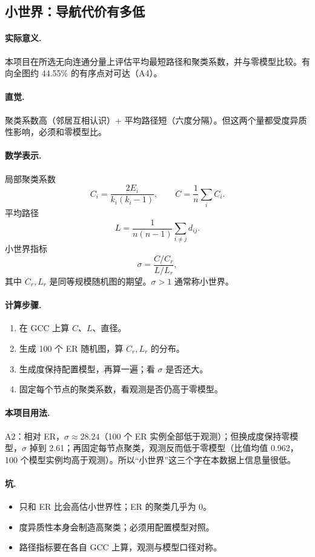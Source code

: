 \subsection{小世界：导航代价有多低}

\paragraph{实际意义.}
本项目在所选无向连通分量上评估平均最短路径和聚类系数，并与零模型比较。有向全图约 44.55\% 的有序点对可达（A4）。

\paragraph{直觉.}
聚类系数高（邻居互相认识）+ 平均路径短（六度分隔）。但这两个量都受度异质性影响，必须和零模型比。

\paragraph{数学表示.}
局部聚类系数
\[
C_i=\frac{2E_i}{k_i(k_i-1)},\qquad C=\frac1n\sum_i C_i.
\]
平均路径
\[
L=\frac{1}{n(n-1)}\sum_{i\ne j}d_{ij}.
\]
小世界指标
\[
\sigma=\frac{C/C_r}{L/L_r},
\]
其中 \(C_r,L_r\) 是同等规模随机图的期望。\(\sigma>1\) 通常称小世界。

\paragraph{计算步骤.}
\begin{enumerate}
  \item 在 GCC 上算 \(C\)、\(L\)、直径。
  \item 生成 100 个 ER 随机图，算 \(C_r,L_r\) 的分布。
  \item 生成度保持配置模型，再算一遍；看 \(\sigma\) 是否还大。
  \item 固定每个节点的聚类系数，看观测是否仍高于零模型。
\end{enumerate}

\paragraph{本项目用法.}
\unit{A2}：相对 ER，\(\sigma\approx 28.24\)（100 个 ER 实例全部低于观测）；但换成度保持零模型，\(\sigma\) 掉到 2.61；再固定每节点聚类，观测反而低于零模型（比值均值 0.962，100 个模型实例均高于观测）。所以“小世界”这三个字在本数据上信息量很低。

\paragraph{坑.}
\begin{itemize}
  \item 只和 ER 比会高估小世界性；ER 的聚类几乎为 0。
  \item 度异质性本身会制造高聚类；必须用配置模型对照。
  \item 路径指标要在各自 GCC 上算，观测与模型口径对称。
\end{itemize}

